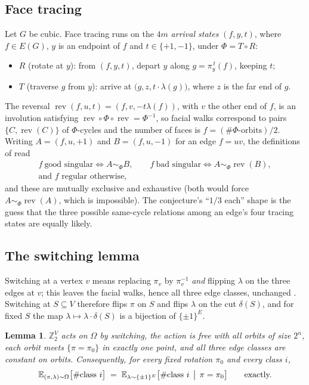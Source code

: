 \documentclass[11pt]{amsart}
\newtheorem{lemma}[theorem]{Lemma}
\begin{document}
\subsection*{Face tracing}
Let $G$ be cubic. Face tracing runs on the $4m$ \emph{arrival states}
$(f,y,t)$, where $f\in E(G)$, $y$ is an endpoint of $f$ and $t\in\{+1,-1\}$,
under $\Phi=T\circ R$:
\begin{itemize}
\item $R$ (rotate at $y$): from $(f,y,t)$, depart $y$ along
$g=\pi_{y}^{\,t}(f)$, keeping $t$;
\item $T$ (traverse $g$ from $y$): arrive at
$\bigl(g,z,t\cdot\lambda(g)\bigr)$, where $z$ is the far end of $g$.
\end{itemize}
The reversal $\operatorname{rev}(f,u,t)=(f,v,-t\lambda(f))$, with $v$ the
other end of $f$, is an involution satisfying
$\operatorname{rev}\circ\Phi\circ\operatorname{rev}=\Phi^{-1}$, so facial
walks correspond to pairs $\{C,\operatorname{rev}(C)\}$ of $\Phi$-cycles and
the number of faces is $f=(\#\Phi\text{-orbits})/2$. Writing $A=(f,u,+1)$ and
$B=(f,u,-1)$ for an edge $f=uv$, the definitions of \cite{GS} read
\begin{equation}\label{eq:class}
\begin{gathered}
 f\ \text{good singular}\iff A\sim_{\Phi}B,\qquad
 f\ \text{bad singular}\iff A\sim_{\Phi}\operatorname{rev}(B),\\
 \text{and $f$ regular otherwise},
\end{gathered}
\end{equation}
and these are mutually exclusive and exhaustive (both would force
$A\sim_{\Phi}\operatorname{rev}(A)$, which is impossible). The conjecture's
``$1/3$ each'' shape is the guess that the three possible same-cycle relations
among an edge's four tracing states are equally likely.

\subsection*{The switching lemma}
Switching at a vertex $v$ means replacing $\pi_v$ by $\pi_v^{-1}$ \emph{and}
flipping $\lambda$ on the three edges at $v$; this leaves the facial walks,
hence all three edge classes, unchanged \cite[\texttt{main.tex} lines
158--161]{GS}. Switching at $S\subseteq V$ therefore flips $\pi$ on $S$ and
flips $\lambda$ on the cut $\delta(S)$, and for fixed $S$ the map
$\lambda\mapsto\lambda\cdot\delta(S)$ is a bijection of $\{\pm1\}^{E}$.

\begin{lemma}\label{lem:gauge}
$\mathbb{Z}_2^{V}$ acts on $\Omega$ by switching, the action is free with all
orbits of size $2^{n}$, each orbit meets $\{\pi=\pi_0\}$ in exactly one point,
and all three edge classes are constant on orbits. Consequently, for every
fixed rotation $\pi_0$ and every class $i$,
\[
 \mathbb{E}_{(\pi,\lambda)\sim\Omega}\bigl[\#\text{class }i\bigr]
 \;=\;
 \mathbb{E}_{\lambda\sim\{\pm1\}^{E}}\bigl[\#\text{class }i \,\bigm|\, \pi=\pi_0\bigr]
 \qquad\text{exactly.}
\]
\end{lemma}
\end{document}
